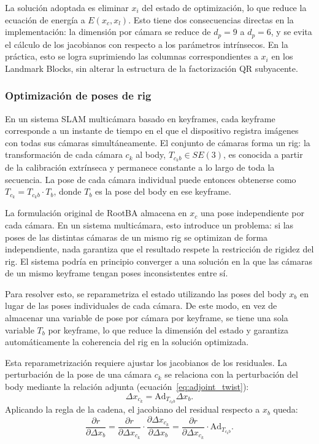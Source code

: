 La solución adoptada es eliminar $x_i$ del estado de optimización, lo que reduce la ecuación de energía a $E(x_c, x_l)$. Esto tiene dos consecuencias directas en la implementación: la dimensión por cámara se reduce de $d_p = 9$ a $d_p = 6$, y se evita el cálculo de los jacobianos con respecto a los parámetros intrínsecos. En la práctica, esto se logra suprimiendo las columnas correspondientes a $x_i$ en los Landmark Blocks, sin alterar la estructura de la factorización QR subyacente.

\subsubsection{Optimización de poses de rig}

En un sistema SLAM multicámara basado en keyframes, cada keyframe corresponde a un instante de tiempo en el que el dispositivo registra imágenes con todas sus cámaras simultáneamente. El conjunto de cámaras forma un rig: la transformación de cada cámara $c_k$ al body, $T_{c_k b} \in SE(3)$, es conocida a partir de la calibración extrínseca y permanece constante a lo largo de toda la secuencia. La pose de cada cámara individual puede entonces obtenerse como $T_{c_k} = T_{c_k b}\cdot T_b$, donde $T_b$ es la pose del body en ese keyframe.

La formulación original de RootBA almacena en $x_c$ una pose independiente por cada cámara. En un sistema multicámara, esto introduce un problema: si las poses de las distintas cámaras de un mismo rig se optimizan de forma independiente, nada garantiza que el resultado respete la restricción de rigidez del rig. El sistema podría en principio converger a una solución en la que las cámaras de un mismo keyframe tengan poses inconsistentes entre sí.

Para resolver esto, se reparametriza el estado utilizando las poses del body $x_b$ en lugar de las poses individuales de cada cámara. De este modo, en vez de almacenar una variable de pose por cámara por keyframe, se tiene una sola variable $T_b$ por keyframe, lo que reduce la dimensión del estado y garantiza automáticamente la coherencia del rig en la solución optimizada.

Esta reparametrización requiere ajustar los jacobianos de los residuales. La perturbación de la pose de una cámara $c_k$ se relaciona con la perturbación del body mediante la relación adjunta (ecuación~\eqref{eq:adjoint_twist}):
\begin{equation}
    \Delta x_{c_k} = \mathrm{Ad}_{T_{c_k b}} \Delta x_b.
\end{equation}
Aplicando la regla de la cadena, el jacobiano del residual respecto a $x_b$ queda:
\begin{equation}
\frac{\partial r}{\partial \Delta x_b} = \frac{\partial r}{\partial \Delta x_{c_k}} \cdot \frac{\partial \Delta x_{c_k}}{\partial \Delta x_b} = \frac{\partial r}{\partial \Delta x_{c_k}}\cdot \mathrm{Ad}_{T_{c_k b}}.
\end{equation}

